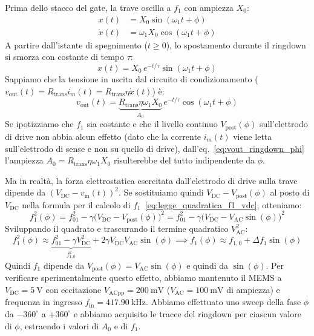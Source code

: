 \documentclass[11pt,a4paper]{article}
\begin{document}
\vspace{0.3cm}
\noindent Prima dello stacco del gate, la trave oscilla a $f_1$ con ampiezza $X_0$:
\begin{align}
    x(t) &= X_0 \sin(\omega_1 t + \phi) \\[4pt]
    \dot{x}(t) &= \omega_1 X_0 \cos(\omega_1 t + \phi)
\end{align}
A partire dall'istante di spegnimento ($t \ge 0$), lo spostamento durante il ringdown si smorza con costante di tempo $\tau$:
\begin{equation}
    x(t) = X_0 \, e^{-t/\tau} \sin(\omega_1 t + \phi)
\end{equation}
Sappiamo che la tensione in uscita dal circuito di condizionamento ($v_{\text{out}}(t) = R_{\text{trans}} i_m(t) = R_{\text{trans}} \eta \dot{x}(t)$) è:
\begin{equation}
    \label{eq:vout_ringdown_phi}
    v_{\text{out}}(t) = \underbrace{R_{\text{trans}} \eta \omega_1 X_0}_{A_0} \, e^{-t/\tau} \cos(\omega_1 t + \phi)
\end{equation}
\noindent Se ipotizziamo che $f_1$ sia costante e che il livello continuo $V_{\text{post}}(\phi)$ sull'elettrodo di drive non abbia alcun effetto (dato che la corrente $i_m(t)$ viene letta sull'elettrodo di sense e non su quello di drive), dall'eq.~\eqref{eq:vout_ringdown_phi} l'ampiezza $A_0 = R_{\text{trans}} \eta \omega_1 X_0$ risulterebbe del tutto indipendente da $\phi$.

\vspace{0.3cm}
\noindent Ma in realtà, la forza elettrostatica esercitata dall'elettrodo di drive sulla trave dipende da $\left(V_{\text{DC}} - v_{\text{in}}(t)\right)^2$. Se sostituiamo quindi $V_{\text{DC}} - V_{\text{post}}(\phi)$ al posto di $V_{\text{DC}}$ nella formula per il calcolo di $f_1$~\eqref{eq:legge_quadratica_f1_vdc}, otteniamo:
\begin{equation}
    \label{eq:f1_quadro_vpost_phi}
    f_1^2(\phi) = f_{01}^2 - \gamma \Big( V_{\text{DC}} - V_{\text{post}}(\phi) \Big)^2 = f_{01}^2 - \gamma \Big( V_{\text{DC}} - V_{\text{AC}}\sin(\phi) \Big)^2
\end{equation}
Sviluppando il quadrato e trascurando il termine quadratico $V_{\text{AC}}^2$:
\begin{equation}
    \label{eq:f1_sin_phi_sviluppo}
    f_1^2(\phi) \approx \underbrace{f_{01}^2 - \gamma V_{\text{DC}}^2}_{f_{1,0}^2} + 2 \gamma V_{\text{DC}} V_{\text{AC}} \sin(\phi) \implies f_1(\phi) \approx f_{1,0} + \Delta f_1 \sin(\phi)
\end{equation}
Quindi $f_1$ dipende da $V_{\text{post}}(\phi) = V_{\text{AC}}\sin(\phi)$ e quindi da $\sin(\phi)$. Per verificare sperimentalmente questo effetto, abbiamo mantenuto il MEMS a $V_{\text{DC}} = \SI{5}{\volt}$ con eccitazione $V_{\text{ACpp}} = \SI{200}{\milli\volt}$ ($V_{\text{AC}} = \SI{100}{\milli\volt}$ di ampiezza) e frequenza in ingresso $f_{\text{in}} = \SI{417.90}{\kilo\hertz}$. Abbiamo effettuato uno sweep della fase $\phi$ da $-360^\circ$ a $+360^\circ$ e abbiamo acquisito le tracce del ringdown per ciascun valore di $\phi$, estraendo i valori di $A_0$ e di $f_1$.
\end{document}
